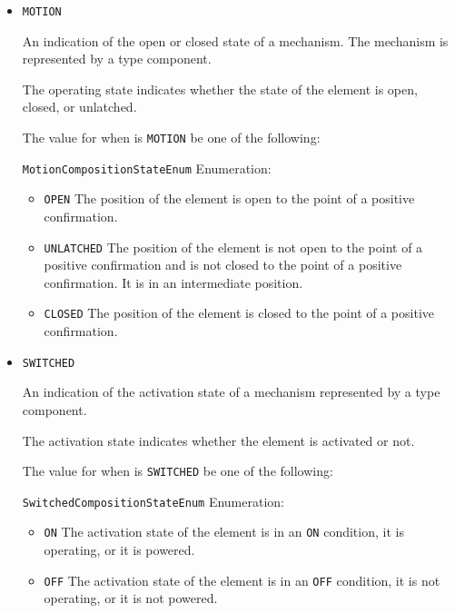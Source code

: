 \begin{itemize}
\item \texttt{MOTION}


An indication of the open or closed state of a mechanism.   The mechanism is represented by a  type component. 

The operating state indicates whether the state of the  element is open, closed, or unlatched.  


The value for  when  is \texttt{MOTION} \MUST be one of the following: 


\texttt{MotionCompositionStateEnum} Enumeration:

\begin{itemize}
\item \texttt{OPEN} \newline The position of the  element is open to the point of a positive confirmation. 
\item \texttt{UNLATCHED} \newline The position of the  element is not open to the
point of a positive confirmation and is not closed to the point of a positive confirmation. It is in an intermediate position. 
\item \texttt{CLOSED} \newline The position of the  element is closed to the point of a positive confirmation. 
\end{itemize}

\item \texttt{SWITCHED}


An indication of the activation state of a mechanism represented by a  type component.

The activation state indicates whether the  element is activated or not.



The value for  when  is \texttt{SWITCHED} \MUST be one of the following: 


\texttt{SwitchedCompositionStateEnum} Enumeration:

\begin{itemize}
\item \texttt{ON} \newline The activation state of the  element is in an \texttt{ON} condition, it is operating, or it is powered. 
\item \texttt{OFF} \newline The activation state of the  element is in an \texttt{OFF} condition, it is not operating, or it is not powered. 
\end{itemize}


\end{itemize}

